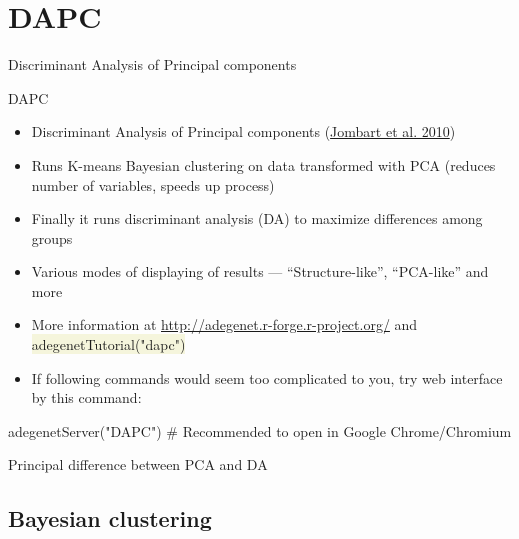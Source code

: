 \documentclass[compress, ucs, xelatex, 11pt, xcolor=svgnames, aspectratio=169,
	hyperref={
		bookmarks=true,
		unicode=true,
		colorlinks=true,
		pdftitle={Molecular data in R},
		plainpages=false,
		pdfauthor={Vojtech Zeisek},
		pdfsubject={Course about phylogeny and evolution in R},
		pdfcreator={XeLaTeX},
		pdfkeywords={R, evolution, phylogeny, molecular data},
		linkcolor=Crimson, %
		anchorcolor=Magenta, %
		citecolor=Magenta, %
		filecolor=Magenta, %
		menucolor=Magenta, %
		urlcolor=DodgerBlue, %
		pdftex},
	url={hyphens, lowtilde} %
	]{beamer}
\renewcommand{\texttt}[1]{\colorbox{Beige}{{\ttfamily #1}}}
\begin{document}
\section{DAPC}

\begin{frame}{Discriminant Analysis of Principal components}
	\tableofcontents[currentsection, sectionstyle=show/hide, hideothersubsections]
\end{frame}

\begin{frame}[fragile]{DAPC}
	\label{DAPC}
	\begin{itemize}
		\item Discriminant Analysis of Principal components (\href{https://bmcgenet.biomedcentral.com/articles/10.1186/1471-2156-11-94}{Jombart et al. 2010})
		\item Runs K-means Bayesian clustering on data transformed with PCA (reduces number of variables, speeds up process)
		\item Finally it runs discriminant analysis (DA) to maximize differences among groups
		\item Various modes of displaying of results --- \enquote{Structure-like}, \enquote{PCA-like} and more
		\item More information at \url{http://adegenet.r-forge.r-project.org/} and \texttt{adegenetTutorial("dapc")}
		\item If following commands would seem too complicated to you, try web interface by this command:
	\end{itemize}
	\begin{spluscode}
    adegenetServer("DAPC") # Recommended to open in Google Chrome/Chromium
	\end{spluscode}
\end{frame}

\begin{frame}{Principal difference between PCA and DA}
	\begin{center}
		\texttt{[image: dapc-da-pca.png]}
	\end{center}
\end{frame}

\subsection{Bayesian clustering}
\end{document}
